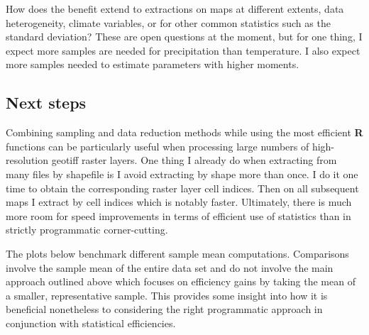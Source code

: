 \documentclass{article}\usepackage[]{graphicx}\usepackage[]{color}
\begin{document}
How does the benefit extend to extractions on maps at different extents, data heterogeneity, climate variables,
or for other common statistics such as the standard deviation?
These are open questions at the moment, but for one thing,
I expect more samples are needed for precipitation than temperature.
I also expect more samples needed to estimate parameters with higher moments.

\subsection{Next steps}

Combining sampling and data reduction methods while using the most efficient \textbf{R} functions can be particularly useful when processing large numbers of high-resolution geotiff raster layers.
One thing I already do when extracting from many files by shapefile is I avoid extracting by shape more than once.
I do it one time to obtain the corresponding raster layer cell indices.
Then on all subsequent maps I extract by cell indices which is notably faster.
Ultimately, there is much more room for speed improvements in terms of efficient use of statistics than in strictly programmatic corner-cutting.

The plots below benchmark different sample mean computations.
Comparisons involve the sample mean of the entire data set and do not involve the main approach outlined above which focuses on efficiency gains by taking the mean of a smaller, representative sample.
This provides some insight into how it is beneficial nonetheless to considering the right programmatic approach in conjunction with statistical efficiencies.
\end{document}
